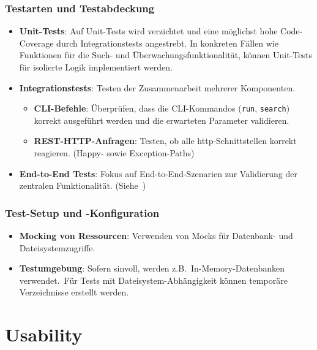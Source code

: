 \documentclass[a4paper,12pt]{report}
\begin{document}
    \subsubsection{Testarten und Testabdeckung}
    \begin{itemize}
        \item \textbf{Unit-Tests}: Auf Unit-Tests wird verzichtet und eine möglichst hohe Code-Coverage durch Integrationstests angestrebt.
        In konkreten Fällen wie Funktionen für die Such- und Überwachungsfunktionalität, können Unit-Tests für isolierte Logik implementiert werden.
        \item \textbf{Integrationstests}: Testen der Zusammenarbeit mehrerer Komponenten.
        \begin{itemize}
            \item \textbf{CLI-Befehle}: Überprüfen, dass die CLI-Kommandos (\texttt{run}, \texttt{search}) korrekt ausgeführt werden und die erwarteten Parameter validieren.
            \item \textbf{REST-HTTP-Anfragen}: Testen, ob alle \gls{http}-Schnittstellen korrekt reagieren.
            (Happy- sowie Exception-Paths)
        \end{itemize}
        \item \textbf{End-to-End Tests}: Fokus auf End-to-End-Szenarien zur Validierung der zentralen Funktionalität.
        (Siehe~)
    \end{itemize}

    \subsubsection{Test-Setup und -Konfiguration}
    \begin{itemize}
        \item \textbf{Mocking von Ressourcen}: Verwenden von Mocks für Datenbank- und Dateisystemzugriffe.
        \item \textbf{Testumgebung}: Sofern sinvoll, werden z.B.\ In-Memory-Datenbanken verwendet.\ Für Tests mit Dateisystem-Abhängigkeit können temporäre Verzeichnisse erstellt werden.
    \end{itemize}

    \clearpage


    \section{Usability}\label{sec:usability}
\end{document}
